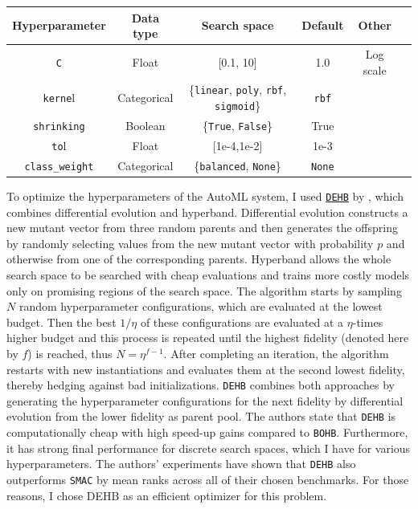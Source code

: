 \documentclass[11pt]{article}
\begin{document}
\vspace{-0.3cm}
\begin{table}[H]
\centering
\begin{tabular}{ | c | c | c | c | c | c | }
 \hline
  Hyperparameter & Data type & Search space & Default & Other \\
 \hline
 \texttt{C} & Float & [0.1, 10]  & 1.0 & Log scale \\ 
 \texttt{kerne}l & Categorical & \{\texttt{linear}, \texttt{poly}, \texttt{rbf}, \texttt{sigmoid}\}  & \texttt{rbf} &   \\ 
 \texttt{shrinking} & Boolean & \{\texttt{True}, \texttt{False}\} & True &  \\ 
 \texttt{to}l & Float & [1e-4,1e-2] & 1e-3 &  \\ 
 \texttt{class\_weight} & Categorical & \{\texttt{balanced}, \texttt{None}\}  & \texttt{None} &  \\ 
 \hline
\end{tabular}
\end{table}
\vspace{-0.3cm}

To optimize the hyperparameters of the AutoML system, I used \href{https://github.com/automl/dehb}{\texttt{DEHB}} by \citet{dehb}, which combines differential evolution and hyperband. Differential evolution constructs a new mutant vector from three random parents and then generates the offspring by randomly selecting values from the new mutant vector with probability $p$ and otherwise from one of the corresponding parents. Hyperband allows the whole search space to be searched with cheap evaluations and trains more costly models only on promising regions of the search space. The algorithm starts by sampling $N$ random hyperparameter configurations, which are evaluated at the lowest budget. Then the best $1/\eta$ of these configurations are evaluated at a $\eta$-times higher budget and this process is repeated until the highest fidelity (denoted here by $f$) is reached, thus $N=\eta^{f-1}$. After completing an iteration, the algorithm restarts with new instantiations and evaluates them at the second lowest fidelity, thereby hedging against bad initializations. \texttt{DEHB} combines both approaches by generating the hyperparameter configurations for the next fidelity by differential evolution from the lower fidelity as parent pool. The authors state that \texttt{DEHB} is computationally cheap with high speed-up gains compared to \texttt{BOHB}. Furthermore, it has strong final performance for discrete search spaces, which I have for various hyperparameters. The authors' experiments have shown that \texttt{DEHB} also outperforms \texttt{SMAC} by mean ranks across all of their chosen benchmarks. For those reasons, I chose DEHB as an efficient optimizer for this problem. \\
\end{document}
